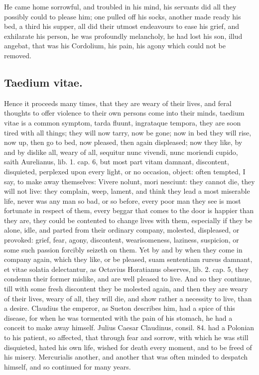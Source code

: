 {He came home sorrowful, and troubled in his mind, his servants did all
they possibly could to please him; one pulled off his socks, another
made ready his bed, a third his supper, all did their utmost endeavours
to ease his grief, and exhilarate his person, he was profoundly
melancholy, he had lost his son, illud angebat, that was his Cordolium,
his pain, his agony which could not be removed.

\subsection{Taedium vitae.}
Hence it proceeds many times, that they are weary of
their lives, and feral thoughts to offer violence to their own persons
come into their minds, taedium vitae is a common symptom, tarda fluunt,
ingrataque tempora, they are soon tired with all things; they will now
tarry, now be gone; now in bed they will rise, now up, then go to bed,
now pleased, then again displeased; now they like, by and by dislike
all, weary of all, sequitur nunc vivendi, nunc moriendi cupido, saith
Aurelianus, lib. 1. cap. 6, but most part vitam damnant,
discontent, disquieted, perplexed upon every light, or no occasion,
object: often tempted, I say, to make away themselves: Vivere
nolunt, mori nesciunt: they cannot die, they will not live: they
complain, weep, lament, and think they lead a most miserable life,
never was any man so bad, or so before, every poor man they see is most
fortunate in respect of them, every beggar that comes to the door is
happier than they are, they could be contented to change lives with
them, especially if they be alone, idle, and parted from their ordinary
company, molested, displeased, or provoked: grief, fear, agony,
discontent, wearisomeness, laziness, suspicion, or some such passion
forcibly seizeth on them. Yet by and by when they come in company
again, which they like, or be pleased, suam sententiam rursus damnant,
et vitae solatia delectantur, as Octavius Horatianus observes, lib. 2.
cap. 5, they condemn their former mislike, and are well pleased to
live. And so they continue, till with some fresh discontent they be
molested again, and then they are weary of their lives, weary of all,
they will die, and show rather a necessity to live, than a desire.
Claudius the emperor, as  Sueton describes him, had a spice of
this disease, for when he was tormented with the pain of his stomach,
he had a conceit to make away himself. Julius Caesar Claudinus, consil.
84. had a Polonian to his patient, so affected, that through fear
and sorrow, with which he was still disquieted, hated his own life,
wished for death every moment, and to be freed of his misery.
Mercurialis another, and another that was often minded to despatch
himself, and so continued for many years.

}

